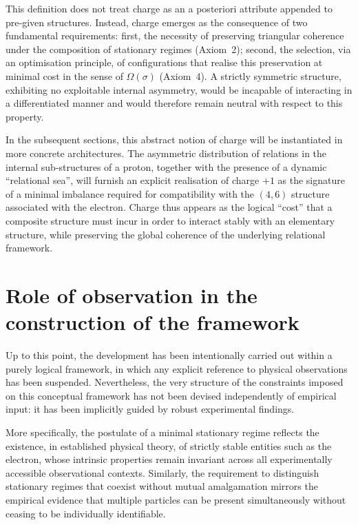 \documentclass[11pt,a4paper]{article}
\begin{document}
This definition does not treat charge as an a posteriori attribute appended to pre‑given structures. Instead, charge emerges as the consequence of two fundamental requirements: first, the necessity of preserving triangular coherence under the composition of stationary regimes (Axiom~2); second, the selection, via an optimisation principle, of configurations that realise this preservation at minimal cost in the sense of \(\Omega(\sigma)\) (Axiom~4). A strictly symmetric structure, exhibiting no exploitable internal asymmetry, would be incapable of interacting in a differentiated manner and would therefore remain neutral with respect to this property. 

In the subsequent sections, this abstract notion of charge will be instantiated in more concrete architectures. The asymmetric distribution of relations in the internal sub‑structures of a proton, together with the presence of a dynamic “relational sea”, will furnish an explicit realisation of charge \(+1\) as the signature of a minimal imbalance required for compatibility with the \((4,6)\) structure associated with the electron. Charge thus appears as the logical “cost” that a composite structure must incur in order to interact stably with an elementary structure, while preserving the global coherence of the underlying relational framework.

\section{Role of observation in the construction of the framework}

Up to this point, the development has been intentionally carried out within a purely logical framework, in which any explicit reference to physical observations has been suspended. Nevertheless, the very structure of the constraints imposed on this conceptual framework has not been devised independently of empirical input: it has been implicitly guided by robust experimental findings.

More specifically, the postulate of a minimal stationary regime reflects the existence, in established physical theory, of strictly stable entities such as the electron, whose intrinsic properties remain invariant across all experimentally accessible observational contexts. Similarly, the requirement to distinguish stationary regimes that coexist without mutual amalgamation mirrors the empirical evidence that multiple particles can be present simultaneously without ceasing to be individually identifiable.
\end{document}
